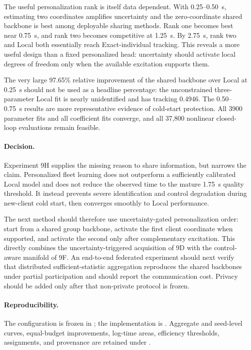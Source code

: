 The useful personalization rank is itself data dependent. With 0.25--0.50~s,
estimating two coordinates amplifies uncertainty and the zero-coordinate shared
backbone is best among deployable sharing methods. Rank one becomes best near
0.75~s, and rank two becomes competitive at 1.25~s. By 2.75~s, rank two and
Local both essentially reach Exact-individual tracking. This reveals a more
useful design than a fixed personalized head: uncertainty should activate local
degrees of freedom only when the available excitation supports them.

The very large 97.65\% relative improvement of the shared backbone over Local at
0.25~s should not be used as a headline percentage: the unconstrained three-
parameter Local fit is nearly unidentified and has tracking 0.4946. The 0.50--
0.75~s results are more representative evidence of cold-start protection. All
3900 parameter fits and all coefficient fits converge, and all 37,800 nonlinear
closed-loop evaluations remain feasible.

\paragraph{Decision.}
Experiment 9H supplies the missing reason to share information, but narrows the
claim. Personalized fleet learning does not outperform a sufficiently calibrated
Local model and does not reduce the observed time to the mature 1.75~s quality
threshold. It instead prevents severe identification and control degradation
during new-client cold start, then converges smoothly to Local performance.

The next method should therefore use uncertainty-gated personalization order:
start from a shared group backbone, activate the first client coordinate when
supported, and activate the second only after complementary excitation. This
directly combines the uncertainty-triggered acquisition of 9D with the
control-aware manifold of 9F. An end-to-end federated experiment should next
verify that distributed sufficient-statistic aggregation reproduces the shared
backbones under partial participation and should report the communication cost.
Privacy should be added only after that non-private protocol is frozen.

\paragraph{Reproducibility.}
The configuration is frozen in ; the
implementation is .
Aggregate and seed-level curves, equal-budget improvements, log-time areas,
efficiency thresholds, assignments, and provenance are retained under
.
